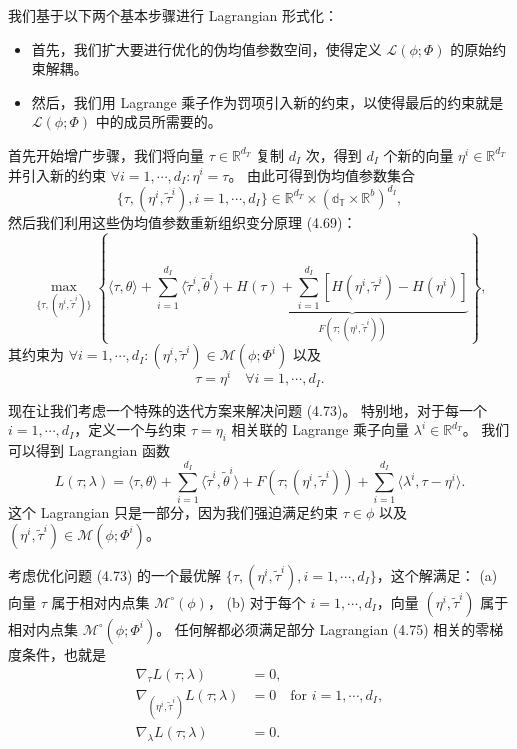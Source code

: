 我们基于以下两个基本步骤进行 Lagrangian 形式化：
\begin{itemize}
    \item 首先，我们扩大要进行优化的伪均值参数空间，使得定义 $\mathcal{L}(\phi; \Phi)$ 的原始约束解耦。
    \item 然后，我们用 Lagrange 乘子作为罚项引入新的约束，以使得最后的约束就是 $\mathcal{L}(\phi; \Phi)$ 中的成员所需要的。
\end{itemize}
首先开始增广步骤，我们将向量 $\tau \in \mathbb{R}^{d_T}$ 复制 $d_I$ 次，得到 $d_I$ 个新的向量 $\eta^i \in \mathbb{R}^{d_T}$ 并引入新的约束 $\forall i = 1, \cdots, d_I: \eta^i = \tau$。
由此可得到伪均值参数集合
\begin{equation*}
    \{\tau, (\eta^i, \tilde{\tau}^i), i = 1, \cdots, d_I\} \in \mathbb{R}^{d_T}\times(\mathbb{d_T}\times\mathbb{R}^b)^{d_I}, 
\end{equation*}
然后我们利用这些伪均值参数重新组织变分原理 (4.69)：
\begin{equation}
    \max_{\{\tau, (\eta^i, \tilde{\tau}^i)\}}\left\{\langle\tau, \theta\rangle + \sum_{i = 1}^{d_I}\langle\tilde{\tau}^i, \tilde{\theta}^i\rangle + \underbrace{H(\tau) + \sum_{i = 1}^{d_I}[H(\eta^i, \tilde{\tau}^i) - H(\eta^i)]}_{F(\tau; (\eta^i, \tilde{\tau}^i))} \right\}, 
\end{equation}
其约束为 $\forall i = 1, \cdots, d_I: (\eta^i, \tilde{\tau}^i) \in \mathcal{M}(\phi; \Phi^i)$ 以及
\begin{equation}
    \tau = \eta^i \quad \forall i = 1, \cdots, d_I.
\end{equation}

现在让我们考虑一个特殊的迭代方案来解决问题 (4.73)。
特别地，对于每一个 $i = 1, \cdots, d_I$，定义一个与约束 $\tau = \eta_i$ 相关联的 Lagrange 乘子向量 $\lambda^i \in \mathbb{R}^{d_T}$。
我们可以得到 Lagrangian 函数
\begin{equation}
    L(\tau; \lambda) = \langle\tau, \theta\rangle + \sum_{i = 1}^{d_I}\langle\tilde{\tau}^i, \tilde{\theta}^i\rangle + F(\tau; (\eta^i, \tilde{\tau}^i)) + \sum_{i = 1}^{d_I}\langle\lambda^i, \tau-\eta^i\rangle.
\end{equation}
这个 Lagrangian 只是一部分，因为我们强迫满足约束 $\tau \in \mathcal{\phi}$ 以及 $(\eta^i, \tilde{\tau}^i) \in \mathcal{M}(\phi; \Phi^i)$。

考虑优化问题 (4.73) 的一个最优解 $\{\tau, (\eta^i, \tilde{\tau}^i), i = 1, \cdots, d_I\}$，这个解满足：
(a) 向量 $\tau$ 属于相对内点集 $\mathcal{M}^\circ(\phi)$，
(b) 对于每个 $i = 1, \cdots, d_I$，向量 $(\eta^i, \tilde{\tau}^i)$ 属于相对内点集 $\mathcal{M}^\circ(\phi; \Phi^i)$。
任何解都必须满足部分 Lagrangian (4.75) 相关的零梯度条件，也就是
\begin{subequations}
\begin{align}
    \nabla_{\tau}L(\tau; \lambda) &= 0, \\
    \nabla_{(\eta^i, \tilde{\tau}^i)}L(\tau; \lambda) &= 0 \quad \text{for } i = 1, \cdots, d_I, \\
    \nabla_{\lambda}L(\tau; \lambda) &= 0.
\end{align}
\end{subequations}

